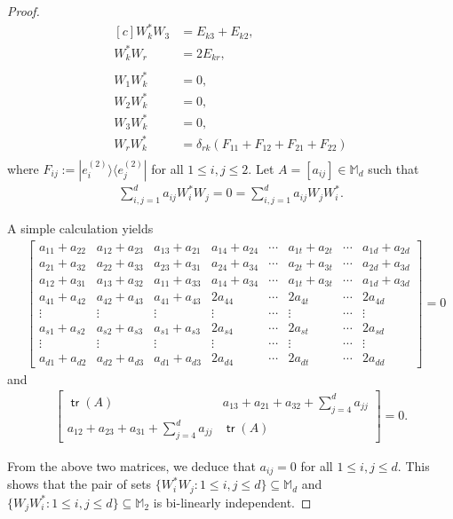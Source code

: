 \documentclass[10pt,reqno]{amsart}
\theoremstyle{definition}
\theoremstyle{plain}
\theoremstyle{remark}
\renewcommand{\sf}[1]{\textsf{#1}}
\newcommand{\mbb}[1]{\mathbb{#1}}
\newcommand{\msc}[1]{\mathscr{#1}}
\newcommand{\M}[1]{\mbb{M}_{#1}}%
\newcommand{\ranko}[2]{|{#1}\rangle\langle{#2}|}
\newcommand{\Matrix}[1]{\begin{bmatrix}#1\end{bmatrix}}
\DeclareMathOperator{\tr}{\sf{tr}}
\numberwithin{equation}{section}%
\begin{document}
\begin{proof}
\begin{equation*}
\begin{aligned}[c]
					W_k^*W_3&=E_{k3}+E_{k2},\\
					W_k^*W_r&=2E_{kr},\\\\
					W_1W_k^*&=0,\\
					W_2W_k^*&=0,\\
					W_3W_k^*&=0,\\
					W_rW_k^*&=\delta_{rk}(F_{11}+F_{12}+F_{21}+F_{22})\\
				\end{aligned}
	\end{equation*}
	\normalsize
	 where $F_{ij}:=\ranko{e_i^{(2)}}{e_j^{(2)}}$ for all $1\leq i,j\leq 2$. Let $A=[a_{ij}]\in\M{d}$ such that
	 \begin{align*}
	 	\sum_{i,j=1}^da_{ij}W_i^*W_j=0=\sum_{i,j=1}^da_{ij}W_jW_i^*.
	 \end{align*}
	 
	 
	 A simple calculation yields
	 \begin{align*}
	 	&\Matrix{a_{11}+a_{22}&a_{12}+a_{23}&a_{13}+a_{21}&a_{14}+a_{24}&\cdots&a_{1t}+a_{2t}&\cdots&a_{1d}+a_{2d}\\
	 		a_{21}+a_{32}&a_{22}+a_{33}&a_{23}+a_{31}&a_{24}+a_{34}&\cdots&a_{2t}+a_{3t}&\cdots&a_{2d}+a_{3d}\\
	 		a_{12}+a_{31}&a_{13}+a_{32}&a_{11}+a_{33}&a_{14}+a_{34}&\cdots&a_{1t}+a_{3t}&\cdots&a_{1d}+a_{3d}\\
	 		a_{41}+a_{42}&a_{42}+a_{43}&a_{41}+a_{43}&2a_{44}&\cdots&2a_{4t}&\cdots&2a_{4d}\\
	 		\vdots&\vdots&\vdots&\vdots&\cdots&\vdots&\cdots&\vdots\\
	 		a_{s1}+a_{s2}&a_{s2}+a_{s3}&a_{s1}+a_{s3}&2a_{s4}&\cdots&2a_{st}&\cdots&2a_{sd}\\
	 		\vdots&\vdots&\vdots&\vdots&\cdots&\vdots&\cdots&\vdots\\
	 		a_{d1}+a_{d2}&a_{d2}+a_{d3}&a_{d1}+a_{d3}&2a_{d4}&\cdots&2a_{dt}&\cdots&2a_{dd}}=0
	 	\end{align*}
	 	 and 
	 	 \begin{align*}
	 	{\Matrix{\tr(A)&a_{13}+a_{21}+a_{32}+\sum\limits_{j=4}^da_{jj}\\
	 			a_{12}+a_{23}+a_{31}+\sum\limits_{j=4}^da_{jj}&\tr(A)}=0}.
	 \end{align*}
	 
	 
	 
	 From the above two matrices, we deduce that $a_{ij}=0$ for all $1\leq i,j\leq d$. This shows that the pair of sets $\{W_i^*W_j:1\leq i,j\leq d\}\subseteq\M{d}$ and $\{W_jW_i^*:1\leq i,j\leq d\}\subseteq\M{2}$ is bi-linearly independent.
\end{proof}
\end{document}
